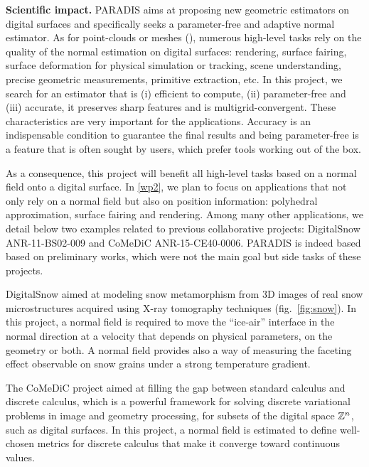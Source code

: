 \noindent\textbf{Scientific impact.}
PARADIS aims at proposing new geometric estimators on digital surfaces and
specifically seeks a parameter-free and adaptive normal estimator.
As for point-clouds or meshes (), numerous high-level tasks
rely on the quality of the normal estimation on digital surfaces: rendering,
surface fairing, surface deformation for physical simulation or tracking,
scene understanding, precise geometric measurements, primitive extraction, etc. 
In this project, we search for an estimator that is (i) efficient to compute,
(ii) parameter-free and (iii) accurate, \ie it preserves sharp features and
is multigrid-convergent. These characteristics are very important for the
applications. Accuracy is an indispensable condition to guarantee the final
results and being parameter-free is a feature that is often sought by users,
which prefer tools working out of the box.

As a consequence, this project will benefit all high-level tasks based on a
normal field onto a digital surface. In \ref{wp2}, we plan to focus on applications
that not only rely on a normal field but also on position information:
polyhedral approximation, surface fairing and rendering. Among many other
applications, we detail below two examples related to previous collaborative projects: 
DigitalSnow ANR-11-BS02-009 and CoMeDiC ANR-15-CE40-0006. PARADIS is indeed based
based on preliminary works, which were not the main goal but side tasks of these projects.

DigitalSnow aimed at modeling snow metamorphism from 3D images of real snow
microstructures acquired using X-ray tomography techniques (fig.~\ref{fig:snow}).
In this project, a normal field is required to move the ``ice-air'' interface
in the normal direction at a velocity that depends on physical parameters,
on the geometry or both. A normal field provides also a way of measuring 
the faceting effect observable on snow grains under a strong temperature gradient.  

The CoMeDiC project aimed at filling the gap between standard calculus and
discrete calculus, which is a powerful framework for solving discrete variational
problems in image and geometry processing, for subsets of the digital space ${\mathbb{Z}}^n$, 
such as digital surfaces. In this project, a normal field is estimated to define
well-chosen metrics for discrete calculus that make it converge toward continuous values.

